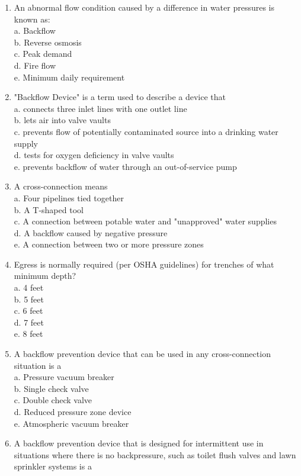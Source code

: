 \begin{enumerate}[1.]
\item An abnormal flow condition caused by a difference in water pressures is known as:\\
a. Backflow\\
b. Reverse osmosis\\
c. Peak demand\\
d. Fire flow\\
e. Minimum daily requirement\\
\item "Backflow Device" is a term used to describe a device that\\
a. connects three inlet lines with one outlet line\\
b. lets air into valve vaults\\
c. prevents flow of potentially contaminated source into a drinking water supply\\
d. tests for oxygen deficiency in valve vaults\\
e. prevents backflow of water through an out-of-service pump\\
\item A cross-connection means\\
a. Four pipelines tied together\\
b. A T-shaped tool\\
c. A connection between potable water and "unapproved" water supplies\\
d. A backflow caused by negative pressure\\
e. A connection between two or more pressure zones\\
\item Egress is normally required (per OSHA guidelines) for trenches of what minimum depth?\\
a. 4 feet\\
b. 5 feet\\
c. 6 feet\\
d. 7 feet\\
e. 8 feet\\
\item A backflow prevention device that can be used in any cross-connection situation is a\\
a. Pressure vacuum breaker\\
b. Single check valve\\
c. Double check valve\\
d. Reduced pressure zone device\\
e. Atmospheric vacuum breaker\\
\item A backflow prevention device that is designed for intermittent use in situations where there is no backpressure, such as toilet flush valves and lawn sprinkler systems is a\\

\end{enumerate}
